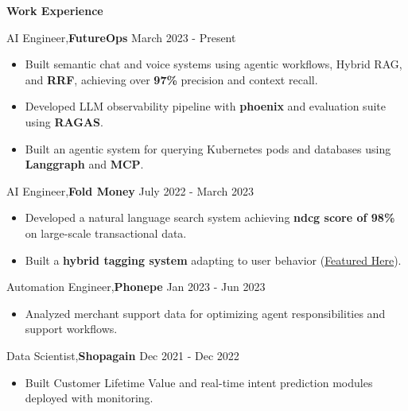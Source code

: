 \documentclass{article}%
\begin{document}
\begin{flushleft}
\bf{\Large{Work Experience}}
\end{flushleft}
\vspace{-2mm}
\hline
\vspace{2mm}
AI Engineer,\textbf {FutureOps} \hfill{March 2023 - Present}
\vspace{-1mm}
\begin{itemize}
\setlength\itemsep{0.01em}
\item Built semantic chat and voice systems using agentic workflows, Hybrid RAG, and \textbf{RRF}, achieving over \textbf{97\%} precision and context recall.
\item Developed LLM observability pipeline with \textbf{phoenix} and evaluation suite using \textbf{RAGAS}.
\item Built an agentic system for querying Kubernetes pods and databases using \textbf{Langgraph} and \textbf{MCP}.
\end{itemize}
\vspace{-1mm}
AI Engineer,\textbf {Fold Money} \hfill{July 2022 - March 2023}
\vspace{-1mm}
\begin{itemize}
\setlength\itemsep{0.01em}
\item Developed a natural language search system achieving \textbf{ndcg score of 98\%} on large-scale transactional data.
\item Built a \textbf{hybrid tagging system} adapting to user behavior (\href{https://fold.money/blog/automating-transaction-tagging}{Featured Here}).
\end{itemize}
\vspace{-1mm}
Automation Engineer,\textbf {Phonepe} \hfill{Jan 2023 - Jun 2023}
\vspace{-1mm}
\begin{itemize}
\setlength\itemsep{0.01em}
\item Analyzed merchant support data for optimizing agent responsibilities and support workflows.
\end{itemize}
\vspace{-1mm}
Data Scientist,\textbf {Shopagain} \hfill{Dec 2021 - Dec 2022}
\vspace{-1mm}
\begin{itemize}
\setlength\itemsep{0.01em}
\item Built Customer Lifetime Value and real-time intent prediction modules deployed with monitoring.
\end{itemize}
\end{document}
